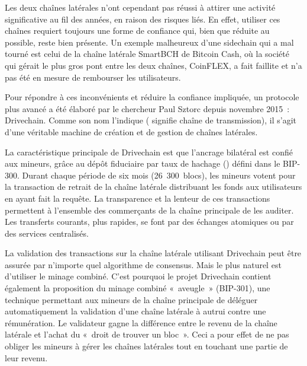 Les deux chaînes latérales n'ont cependant pas réussi à attirer une activité significative au fil des années, en raison des risques liés. En effet, utiliser ces chaînes requiert toujours une forme de confiance qui, bien que réduite au possible, reste bien présente. Un exemple malheureux d'une sidechain qui a mal tourné est celui de la chaîne latérale SmartBCH de Bitcoin Cash, où la société qui gérait le plus gros pont entre les deux chaînes, CoinFLEX, a fait faillite et n'a pas été en mesure de rembourser les utilisateurs.


Pour répondre à ces inconvénients et réduire la confiance impliquée, un protocole plus avancé a été élaboré par le chercheur Paul Sztorc depuis novembre 2015~: Drivechain. Comme son nom l'indique ( signifie chaîne de transmission), il s'agit d'une véritable machine de création et de gestion de chaînes latérales.

La caractéristique principale de Drivechain est que l'ancrage bilatéral est confié aux mineurs, grâce au dépôt fiduciaire par taux de hachage () défini dans le BIP-300. Durant chaque période de six mois (26~300~blocs), les mineurs votent pour la transaction de retrait de la chaîne latérale distribuant les fonds aux utilisateurs en ayant fait la requête. La transparence et la lenteur de ces transactions permettent à l'ensemble des commerçants de la chaîne principale de les auditer. Les transferts courants, plus rapides, se font par des échanges atomiques ou par des services centralisés.

La validation des transactions sur la chaîne latérale utilisant Drivechain peut être assurée par n'importe quel algorithme de consensus. Mais le plus naturel est d'utiliser le minage combiné. C'est pourquoi le projet Drivechain contient également la proposition du minage combiné «~aveugle~» (BIP-301), une technique permettant aux mineurs de la chaîne principale de déléguer automatiquement la validation d'une chaîne latérale à autrui contre une rémunération. Le validateur gagne la différence entre le revenu de la chaîne latérale et l'achat du «~droit de trouver un bloc~». Ceci a pour effet de ne pas obliger les mineurs à gérer les chaînes latérales tout en touchant une partie de leur revenu. %

